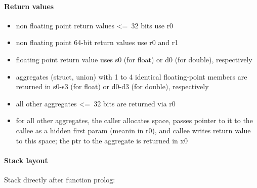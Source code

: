 \paragraph{Return values}

\begin{itemize}
\item non floating point return values \textless=\ 32 bits use r0
\item non floating point 64-bit return values use r0 and r1
\item floating point return value uses s0 (for float) or d0 (for double), respectively
\item aggregates (struct, union) with 1 to 4 identical floating-point members are returned in s0-s3 (for float) or d0-d3 (for double), respectively
\item all other aggregates \textless=\ 32 bits are returned via r0
\item for all other aggregates, the caller allocates space, passes pointer to it to the callee as a hidden first param
(meanin in r0), and callee writes return value to this space; the ptr to the aggregate is returned in x0
\end{itemize}

\paragraph{Stack layout}

Stack directly after function prolog:\\

